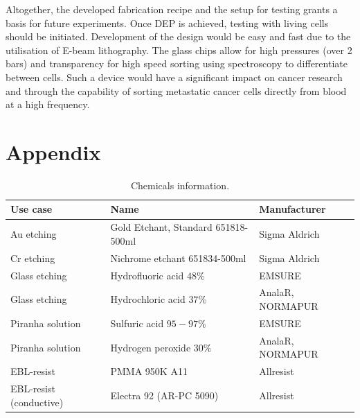\documentclass[final]{jyflluk}
\begin{document}
Altogether, the developed fabrication recipe and the setup for testing grants a basis for future experiments. Once DEP is achieved, testing with living cells should be initiated. Development of the design would be easy and fast due to the utilisation of E-beam lithography. The glass chips allow for high pressures (over 2 bars) and transparency for high speed sorting using spectroscopy to differentiate between cells. Such a device would have a significant impact on cancer research and through the capability of sorting metastatic cancer cells directly from blood at a high frequency.


\nocite{*}

\printbibliography
\appendix

\section{Appendix}
\label{sec:chemicals}

\begin{table}[h]
    \centering
    \caption{Chemicals information.}
    \label{tab:chemicals}
    \begin{tabular}{||l l l||} \toprule
       \textbf{Use case}    & \textbf{Name} & \textbf{Manufacturer} \\ \midrule
       Au etching   & Gold Etchant, Standard 651818-500ml  &  Sigma Aldrich \\ \hline
       Cr etching  &  Nichrome etchant 651834-500ml  &  Sigma Aldrich \\\hline
       Glass etching  &  Hydrofluoric acid $48\percent$  &  EMSURE \\\hline
       Glass etching   &  Hydrochloric acid $37\percent$  & AnalaR, NORMAPUR \\\hline
       Piranha solution & Sulfuric acid $95-97\percent$ & EMSURE \\\hline
       Piranha solution & Hydrogen peroxide $30\percent$ & AnalaR, NORMAPUR \\\hline
       EBL-resist & PMMA 950K A11 & Allresist \\\hline
       EBL-resist (conductive) & Electra 92 (AR-PC 5090) & Allresist \\\hline
         \bottomrule
    \end{tabular}
 \end{table}
\end{document}
